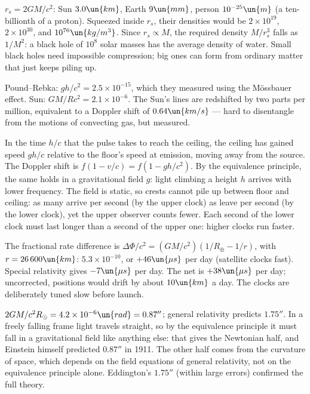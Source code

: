 
 $r_s = 2GM/c^2$: Sun $3.0\un{km}$, Earth $9\un{mm}$, person $10^{-25}\un{m}$ (a ten-billionth of a proton). Squeezed inside $r_s$, their densities would be $2\times10^{19}$, $2\times10^{30}$, and $10^{76}\un{kg/m^3}$. Since $r_s\propto M$, the required density $M/r_s^3$ falls as $1/M^2$: a black hole of $10^8$ solar masses has the average density of water. Small black holes need impossible compression; big ones can form from ordinary matter that just keeps piling up.

 Pound--Rebka: $gh/c^2 = 2.5\times10^{-15}$, which they measured using the M\"ossbauer effect. Sun: $GM/Rc^2 = 2.1\times10^{-6}$. The Sun's lines are redshifted by two parts per million, equivalent to a Doppler shift of $0.64\un{km/s}$ --- hard to disentangle from the motions of convecting gas, but measured.

 In the time $h/c$ that the pulse takes to reach the ceiling, the ceiling has gained speed $gh/c$ relative to the floor's speed at emission, moving away from the source. The Doppler shift is $f(1 - v/c) = f(1 - gh/c^2)$. By the equivalence principle, the same holds in a gravitational field $g$: light climbing a height $h$ arrives with lower frequency. The field is static, so crests cannot pile up between floor and ceiling: as many arrive per second (by the upper clock) as leave per second (by the lower clock), yet the upper observer counts fewer. Each second of the lower clock must last longer than a second of the upper one: higher clocks run faster.

 The fractional rate difference is $\Delta\Phi/c^2 = (GM/c^2)(1/R_\oplus - 1/r)$, with $r = 26\,600\un{km}$: $5.3\times10^{-10}$, or $+46\un{\mu s}$ per day (satellite clocks fast). Special relativity gives $-7\un{\mu s}$ per day. The net is $+38\un{\mu s}$ per day; uncorrected, positions would drift by about $10\un{km}$ a day. The clocks are deliberately tuned slow before launch.

 $2GM/c^2R_\odot = 4.2\times10^{-6}\un{rad} = 0.87''$; general relativity predicts $1.75''$. In a freely falling frame light travels straight, so by the equivalence principle it must fall in a gravitational field like anything else: that gives the Newtonian half, and Einstein himself predicted $0.87''$ in 1911. The other half comes from the curvature of space, which depends on the field equations of general relativity, not on the equivalence principle alone. Eddington's $1.75''$ (within large errors) confirmed the full theory.

